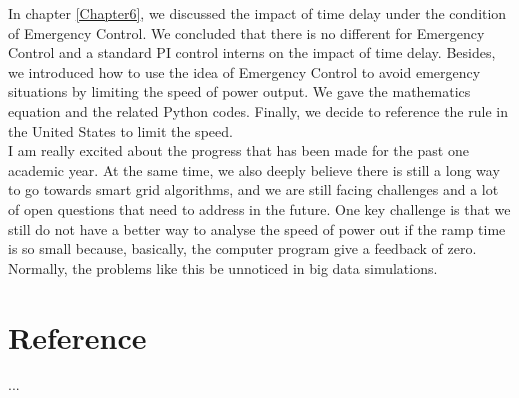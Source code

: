 \documentclass{report}
\begin{document}
In chapter \textcolor{red}{\ref{Chapter6}}, we discussed the impact of time delay under the condition of  Emergency Control. We concluded that there is no different for Emergency Control and a standard PI control interns on the impact of time delay. Besides, we introduced how to use the idea of Emergency Control to avoid emergency situations by limiting the speed of power output. We gave the mathematics equation and the related Python codes. Finally, we decide to reference the rule in the United States to limit the speed.\\

I am really excited about the progress that has been made for the past one academic year. At the same time, we also deeply believe there is still a long way to go towards smart grid algorithms, and we are still facing challenges and a lot of open questions that need to address in the future. One key challenge is that we still do not have a better way to analyse the speed of power out if the ramp time is so small because, basically, the computer program give a feedback of zero. Normally, the problems like this be unnoticed in big data simulations.\\



\appendix
\chapter{Reference}
...


\end{document}
